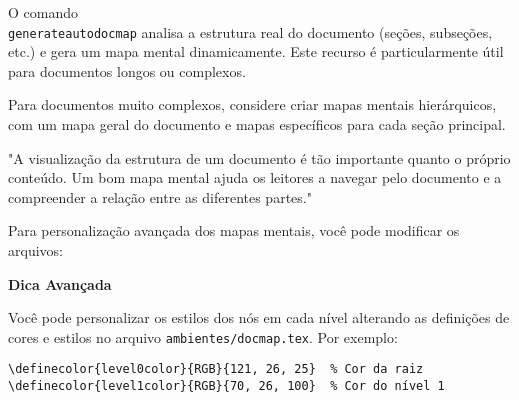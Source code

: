 \documentclass[12pt, a4paper]{book}
\begin{document}
O comando \texttt{\\generateautodocmap} analisa a estrutura real do documento (seções, subseções, etc.) e gera um mapa mental dinamicamente. Este recurso é particularmente útil para documentos longos ou complexos.

\generateautodocmap


\begin{itemize}
\end{itemize}

\begin{dmnote}
Para documentos muito complexos, considere criar mapas mentais hierárquicos, com um mapa geral do documento e mapas específicos para cada seção principal.
\end{dmnote}


\begin{quotebox}
"A visualização da estrutura de um documento é tão importante quanto o próprio conteúdo. Um bom mapa mental ajuda os leitores a navegar pelo documento e a compreender a relação entre as diferentes partes."
\end{quotebox}

Para personalização avançada dos mapas mentais, você pode modificar os arquivos:

\begin{itemize}
\end{itemize}

\begin{magicitem}
\textbf{Dica Avançada}

Você pode personalizar os estilos dos nós em cada nível alterando as definições de cores e estilos no arquivo \texttt{ambientes/docmap.tex}. Por exemplo:

\begin{verbatim}
\definecolor{level0color}{RGB}{121, 26, 25}  % Cor da raiz
\definecolor{level1color}{RGB}{70, 26, 100}  % Cor do nível 1
\end{verbatim}
\end{magicitem}
\end{document}
